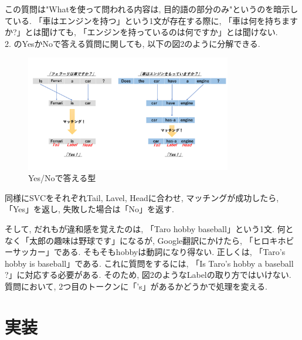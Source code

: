 ﻿\documentclass[uplatex,12pt]{jsarticle}
\begin{document}
この質問は"Whatを使って問われる内容は, 目的語の部分のみ"というのを暗示している. 「車はエンジンを持つ」という1文が存在する際に, 「車は何を持ちますか?」とは聞けても, 「エンジンを持っているのは何ですか」とは聞けない. \\

2. のYesかNoで答える質問に関しても, 以下の図2のように分解できる.
\begin{figure}[htbp]
 \begin{center}
  \includegraphics[width = 9cm, pagebox = cropbox, clip]{英文構造_YesNo型.pdf}
 \end{center}
 \caption[]{Yes/Noで答える型}\label{fig:fig1.1}
\end{figure}

 同様にSVCをそれぞれTail, Lavel, Headに合わせ, マッチングが成功したら, 「Yes」を返し, 失敗した場合は「No」を返す.

そして, だれもが違和感を覚えたのは, 「Taro hobby baseball」という1文. 何となく「太郎の趣味は野球です」になるが, Google翻訳にかけたら, 「ヒロキホビーサッカー」である. そもそもhobbyは動詞になり得ない. 正しくは, 「Taro's hobby is baseball」である. これに質問をするには, 「Is Taro's hobby a baseball ?」に対応する必要がある. そのため, 図2のようなLabelの取り方ではいけない. 質問において, 2つ目のトークンに「's」があるかどうかで処理を変える.

\section{実装}
\end{document}
